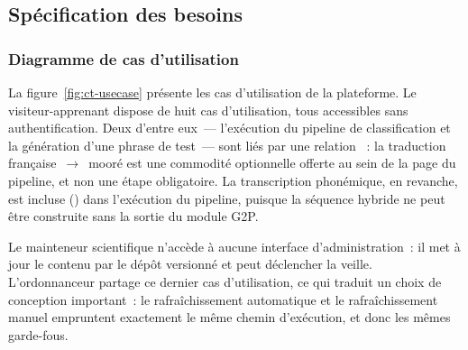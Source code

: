 \subsection{Spécification des besoins}

\subsubsection{Diagramme de cas d'utilisation}

La figure~\ref{fig:ct-usecase} présente les cas d'utilisation de la plateforme. Le
visiteur-apprenant dispose de huit cas d'utilisation, tous accessibles sans
authentification. Deux d'entre eux~--- l'exécution du pipeline de classification et
la génération d'une phrase de test~--- sont liés par une relation
~: la traduction française~$\rightarrow$~mooré est une commodité
optionnelle offerte au sein de la page du pipeline, et non une étape obligatoire.
La transcription phonémique, en revanche, est incluse () dans
l'exécution du pipeline, puisque la séquence hybride ne peut être construite sans
la sortie du module G2P.

Le mainteneur scientifique n'accède à aucune interface d'administration~: il met à
jour le contenu par le dépôt versionné et peut déclencher la veille. L'ordonnanceur
partage ce dernier cas d'utilisation, ce qui traduit un choix de conception
important~: le rafraîchissement automatique et le rafraîchissement manuel empruntent
exactement le même chemin d'exécution, et donc les mêmes garde-fous.

